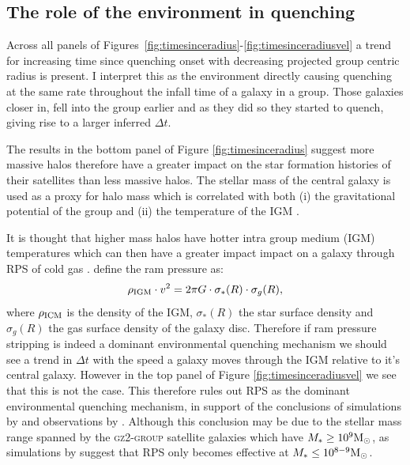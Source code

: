 \subsection{The role of the environment in quenching}\label{sec:roleenv}

Across all panels of Figures~\ref{fig:timesinceradius}-\ref{fig:timesinceradiusvel} a trend for increasing time since quenching onset with decreasing projected group centric radius is present. I interpret this as the environment directly causing quenching at the same rate throughout the infall time of a galaxy in a group. Those galaxies closer in, fell into the group earlier and as they did so they started to quench, giving rise to a larger inferred $\Delta t$.

The results in the bottom panel of  Figure \ref{fig:timesinceradius} suggest more massive halos therefore have a greater impact on the star formation histories of their satellites than less massive halos. The stellar mass of the central galaxy is used as a proxy for halo mass which is correlated with both (i) the gravitational potential of the group \citep{ref} and (ii) the temperature of the IGM \citep{ref}.

It is thought that higher mass halos have hotter intra group medium (IGM) temperatures \citep{ref} which can then have a greater impact impact on a galaxy through RPS of cold gas \citep{ref}. \cite{gunngott72} define the ram pressure as:
\begin{equation}\label{eq:rps}
\rho_{\rm{IGM}}\cdot v^2 = 2\pi G \cdot \sigma_*(R) \cdot \sigma_g(R),
\end{equation}
where $\rho_{\rm{ICM}}$ is the density of the IGM, $\sigma_*(R)$ the star surface density and $\sigma_g(R)$ the gas surface density of the galaxy disc. Therefore if ram pressure stripping is indeed a dominant environmental quenching mechanism we should see a trend in $\Delta t$ with the speed a galaxy moves through the IGM relative to it's central galaxy.  However in the top panel of Figure \ref{fig:timesinceradiusvel} we see that this is not the case. This therefore rules out RPS as the dominant environmental quenching mechanism, in support of the conclusions of simulations by \citet{emerick16, fillingham16} and observations by \citet{mcgee14}. Although this conclusion may be due to the stellar mass range spanned by the \textsc{gz2-group} satellite galaxies which have $M_* \geq 10^9 \rm{M}_{\odot}$, as simulations by \cite{fillingham16} suggest that RPS only becomes effective at $M_* \leq 10^{8-9} \rm{M}_{\odot}$. 

